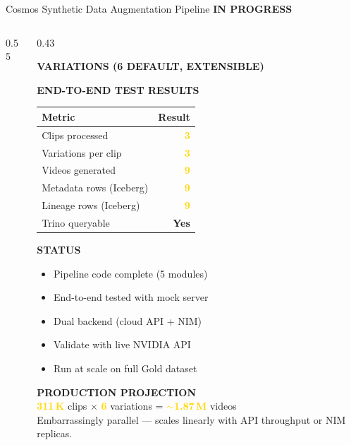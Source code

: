 \documentclass[aspectratio=169,11pt]{beamer}
\begin{document}
\begin{frame}{Cosmos Synthetic Data Augmentation Pipeline
  \hfill\colorbox{gold!20}{\scriptsize\textcolor{gold!80!black}{\textbf{IN PROGRESS}}}}
\begin{columns}[T]
\begin{column}{0.55\textwidth}
\end{column}

\begin{column}{0.43\textwidth}

{\footnotesize\textbf{\textcolor{accent}{VARIATIONS (6 DEFAULT, EXTENSIBLE)}}}\\[3pt]
{\scriptsize
{}\;
\;
\;
\;
\;
}

\vspace{6pt}
{\footnotesize\textbf{\textcolor{accent}{END-TO-END TEST RESULTS}}}\\[2pt]
{\scriptsize
\begin{tabular}{@{}lr@{}}
\toprule
Metric & Result \\
\midrule
Clips processed & \textbf{\textcolor{gold}{3}} \\
Variations per clip & \textbf{\textcolor{gold}{3}} \\
Videos generated & \textbf{\textcolor{gold}{9}} \\
Metadata rows (Iceberg) & \textbf{\textcolor{gold}{9}} \\
Lineage rows (Iceberg) & \textbf{\textcolor{gold}{9}} \\
Trino queryable & \textbf{\textcolor{good}{Yes}} \\
\bottomrule
\end{tabular}
}

\vspace{6pt}
{\footnotesize\textbf{\textcolor{accent}{STATUS}}}\\[3pt]
{\scriptsize
\begin{itemize}\setlength\itemsep{1pt}
  \item[\textcolor{good}{\checkmark}] Pipeline code complete (5 modules)
  \item[\textcolor{good}{\checkmark}] End-to-end tested with mock server
  \item[\textcolor{good}{\checkmark}] Dual backend (cloud API + NIM)
  \item[\textcolor{gold}{$\circ$}] Validate with live NVIDIA API
  \item[\textcolor{gold}{$\circ$}] Run at scale on full Gold dataset
\end{itemize}
}

\vspace{6pt}
{\footnotesize\textbf{\textcolor{accent}{PRODUCTION PROJECTION}}}\\[2pt]
{\scriptsize
\textbf{\textcolor{gold}{311\,K}} clips $\times$
\textbf{\textcolor{gold}{6}} variations =
\textbf{\textcolor{gold}{$\sim$1.87\,M}} videos\\
{\tiny\color{muted} Embarrassingly parallel --- scales linearly with API throughput or NIM replicas.}
}


\end{column}
\end{columns}
\end{frame}
\end{document}
